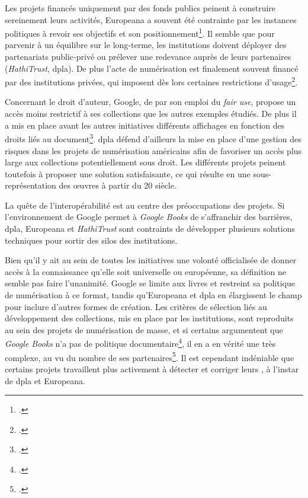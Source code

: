 Les projets financés uniquement par des fonds publics peinent à construire sereinement leurs activités, Europeana a souvent été contrainte par les instances politiques à revoir ses objectifs et son positionnement\footcite{thylstrup_politics_2018}. Il semble que pour parvenir à un équilibre sur le long-terme, les institutions doivent déployer des partenariats public-privé ou prélever une redevance auprès de leurs partenaires (\textit{HathiTrust}, \gls{dpla}). De plus l'acte de numérisation est finalement souvent financé par des institutions privées, qui imposent dès lors certaines restrictions d'usage\footcite{thelle_persuasive_2011}. 

Concernant le droit d'auteur, Google, de par son emploi du \textit{fair use}, propose un accès moins restrictif à ses collections que les autres exemples étudiés. De plus il a mis en place avant les autres initiatives différents affichages en fonction des droits liés au document\footcite{leetaru_mass_2008}. \gls{dpla} défend d'ailleurs la mise en place d'une gestion des risques dans les projets de numérisation américains afin de favoriser un accès plus large aux collections potentiellement sous droit. Les différents projets peinent toutefois à proposer une solution satisfaisante, ce qui résulte en une sous-représentation des \oe{}uvres à partir du 20 siècle. 

La quête de l'interopérabilité est au centre des préoccupations des projets. Si l'environnement de Google permet à \textit{Google Books} de s'affranchir des barrières, \gls{dpla}, Europeana et \textit{HathiTrust} sont contraints de développer plusieurs solutions techniques pour sortir des silos des institutions.

Bien qu'il y ait au sein de toutes les initiatives une volonté officialisée de donner accès à la connaissance qu'elle soit universelle ou européenne, sa définition ne semble pas faire l'unanimité. Google se limite aux livres et restreint sa politique de numérisation à ce format, tandis qu'Europeana et \gls{dpla} en élargissent le champ pour inclure d'autres formes de création. Les critères de sélection liés au développement des collections, mis en place par les institutions, sont reproduits au sein des projets de numérisation de masse, et si certains argumentent que \textit{Google Books} n'a pas de politique documentaire\footcite{dufrene_numerisation_2013}, il en a en vérité une très complexe, au vu du nombre de ses partenaires\footcite{coutts_stepping_2017}. Il est cependant indéniable que certains projets travaillent plus activement à détecter et corriger leurs , à l'instar de \gls{dpla} et Europeana. 

